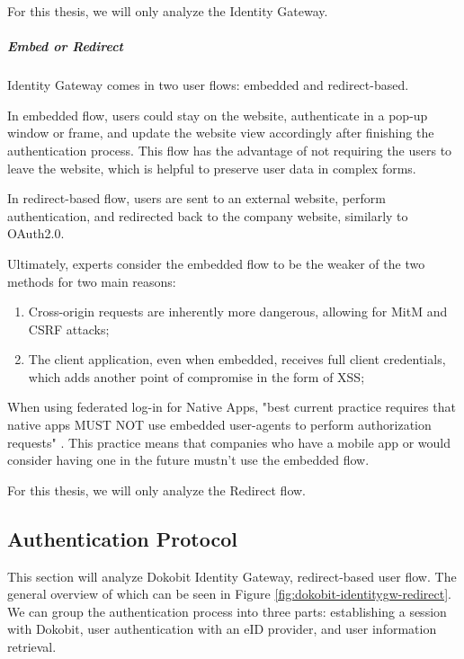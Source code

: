 For this thesis, we will only analyze the Identity Gateway.

\subparagraph{Embed or Redirect}

Identity Gateway comes in two user flows: embedded and redirect-based.

In embedded flow, users could stay on the website, authenticate in a pop-up window or frame, and update the website view accordingly after finishing the authentication process. This flow has the advantage of not requiring the users to leave the website, which is helpful to preserve user data in complex forms.

In redirect-based flow, users are sent to an external website, perform authentication, and redirected back to the company website, similarly to OAuth2.0.

Ultimately, experts consider the embedded flow to be the weaker of the two methods \cite{auth0-universal-vs-embedded} for two main reasons:

\begin{enumerate}
  \item Cross-origin requests are inherently more dangerous, allowing for MitM and CSRF attacks;
  \item The client application, even when embedded, receives full client credentials, which adds another point of compromise in the form of XSS;
\end{enumerate}

When using federated log-in for Native Apps, "best current practice requires that native apps MUST NOT use embedded user-agents to perform authorization requests" \cite{rfc8252}. This practice means that companies who have a mobile app or would consider having one in the future mustn't use the embedded flow.

For this thesis, we will only analyze the Redirect flow.

\subsection{Authentication Protocol}

This section will analyze Dokobit Identity Gateway, redirect-based user flow. The general overview of which can be seen in Figure \ref{fig:dokobit-identitygw-redirect}. We can group the authentication process into three parts: establishing a session with Dokobit, user authentication with an eID provider, and user information retrieval.

